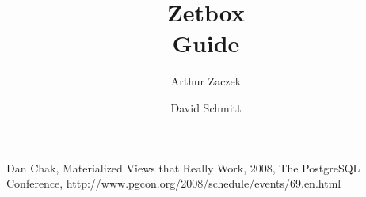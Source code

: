 \documentclass[a4paper,12pt]{report}
\begin{document}
\addtolength{\textheight}{2cm}
\addtolength{\topmargin}{-1cm}


\newenvironment{note}
{\vspace*{5mm}\begin{framed}\rule{1ex}{1ex}\hspace{\stretch{1}} Note: }
{\hspace{\stretch{1}}\rule{1ex}{1ex}\end{framed}}


\title{Zetbox\\Guide}
\author{Arthur Zaczek}
\author{David Schmitt}

\pagestyle{empty}



\tableofcontents

\setlength{\headheight}{15pt}

\pagestyle{fancy}

\renewcommand{\chaptermark}[1]{\markboth{\chaptername\ \thechapter.\ #1}{}}
\renewcommand{\sectionmark}[1]{\markright{\thesection.\ #1}}

\newenvironment{descriptionBorder}
{
  \begin{framed}
  \begin{description}[labelindent=3mm,leftmargin=*,topsep=0mm]
}
{
  \end{description}
  \end{framed}
}







% 

\begin{thebibliography}{99}





Dan Chak, Materialized Views that Really Work,
2008, The PostgreSQL Conference, http://www.pgcon.org/2008/schedule/events/69.en.html

\end{thebibliography}

\listoffigures


\end{document}
